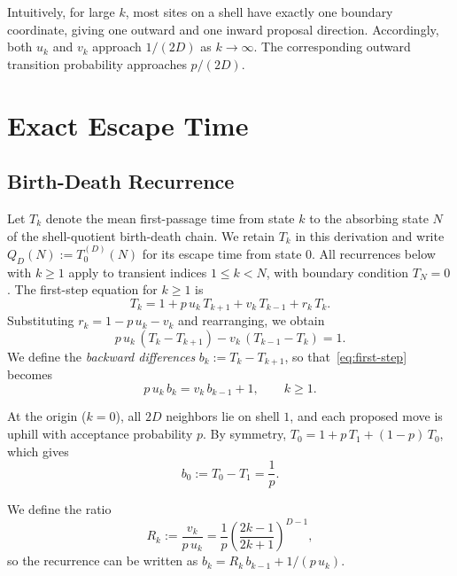 \documentclass[conference]{IEEEtran}
\begin{document}
Intuitively, for large $k$, most sites on a shell have exactly one boundary
coordinate, giving one outward and one inward proposal direction.
Accordingly, both $u_k$ and $v_k$ approach $1/(2D)$ as
$k\to\infty$. The corresponding outward transition probability
approaches $p/(2D)$.

\section{Exact Escape Time}

\subsection{Birth-Death Recurrence}

Let $T_k$ denote the mean first-passage time from state $k$ to the absorbing
state $N$ of the shell-quotient birth-death chain.
We retain $T_k$ in this derivation and write $Q_D(N):=T_0^{(D)}(N)$
for its escape time from state $0$. All recurrences below with $k\ge1$ apply to transient indices
$1\le k<N$, with boundary condition $T_N=0$.
The first-step equation for $k \ge 1$ is
\[
T_k = 1 + p\,u_k\,T_{k+1} + v_k\,T_{k-1} + r_k\,T_k.
\]
Substituting $r_k = 1 - p\,u_k - v_k$ and rearranging, we obtain
\begin{equation}
\label{eq:first-step}
p\,u_k\,(T_k - T_{k+1}) - v_k\,(T_{k-1} - T_k) = 1.
\end{equation}
We define the \emph{backward differences}
$b_k := T_k - T_{k+1}$,
so that~\eqref{eq:first-step} becomes
\begin{equation}
\label{eq:recurrence}
\boxed{p\,u_k\,b_k = v_k\,b_{k-1} + 1, \qquad k \ge 1.}
\end{equation}

At the origin ($k=0$), all $2D$ neighbors lie on shell $1$, and each
proposed move is uphill with acceptance probability $p$.
By symmetry, $T_0 = 1 + p\,T_1 + (1-p)\,T_0$, which gives
\begin{equation}
\label{eq:b0}
\boxed{b_0 := T_0 - T_1 = \frac{1}{p}.}
\end{equation}

We define the ratio
\begin{equation}
\label{eq:Rk}
R_k := \frac{v_k}{p\,u_k}
= \frac{1}{p}\left(\frac{2k-1}{2k+1}\right)^{D-1},
\end{equation}
so the recurrence can be written as $b_k = R_k\,b_{k-1} + 1/(p\,u_k)$.
\end{document}
